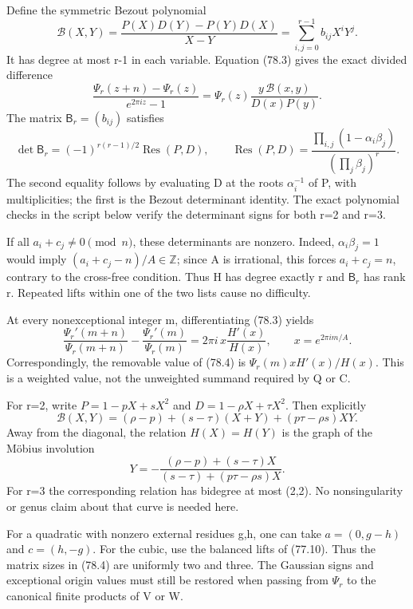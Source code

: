 \documentclass[11pt,reqno]{amsart}
\theoremstyle{plain}
\begin{document}
Define the symmetric Bezout polynomial
\[
 \mathcal B(X,Y)=
 \frac{P(X)D(Y)-P(Y)D(X)}{X-Y}
 =\sum_{i,j=0}^{r-1} b_{ij}X^iY^j.
\]
It has degree at most r-1 in each variable. Equation (78.3) gives
the exact divided difference
\begin{equation*}
 \boxed{\displaystyle
 \frac{\Psi_r(z+n)-\Psi_r(z)}{e^{2\pi iz}-1}
 =\Psi_r(z)\frac{y\,\mathcal B(x,y)}{D(x)P(y)}.}
 \tag{78.4}
\end{equation*}
The matrix \(\mathsf B_r=(b_{ij})\) satisfies
\begin{equation*}
 \det\mathsf B_r=(-1)^{r(r-1)/2}\operatorname{Res}(P,D),
 \qquad
 \operatorname{Res}(P,D)
 =\frac{\prod_{i,j}(1-\alpha_i\beta_j)}
        {(\prod_j\beta_j)^r}.
 \tag{78.5}
\end{equation*}
The second equality follows by evaluating D at the roots
\(\alpha_i^{-1}\) of P, with multiplicities; the first is the
Bezout determinant identity. The exact polynomial checks in the
script below verify the determinant signs for both r=2 and r=3.

If all \(a_i+c_j\ne0\pmod n\), these determinants are nonzero.
Indeed, \(\alpha_i\beta_j=1\) would imply
\((a_i+c_j-n)/A\in\mathbb Z\); since A is irrational, this
forces \(a_i+c_j=n\), contrary to the cross-free condition.
Thus H has degree exactly r and \(\mathsf B_r\) has rank r.
Repeated lifts within one of the two lists cause no difficulty.

At every nonexceptional integer m, differentiating (78.3) yields
\begin{equation*}
 \frac{\Psi_r'(m+n)}{\Psi_r(m+n)}-
 \frac{\Psi_r'(m)}{\Psi_r(m)}
 =2\pi i\,x\frac{H'(x)}{H(x)},
 \qquad x=e^{2\pi im/A}.
 \tag{78.6}
\end{equation*}
Correspondingly, the removable value of (78.4) is
\(\Psi_r(m)xH'(x)/H(x)\). This is a weighted value, not
the unweighted summand required by Q or C.

For r=2, write
\(P=1-pX+sX^2\) and \(D=1-\rho X+\tau X^2\).
Then explicitly
\[
 \mathcal B(X,Y)=(\rho-p)+(s-\tau)(X+Y)
                    +(p\tau-\rho s)XY.
\]
Away from the diagonal, the relation \(H(X)=H(Y)\) is the
graph of the M\"obius involution
\[
 Y=-\frac{(\rho-p)+(s-\tau)X}
          {(s-\tau)+(p\tau-\rho s)X}.
\]
For r=3 the corresponding relation has bidegree at most (2,2).
No nonsingularity or genus claim about that curve is needed here.

For a quadratic with nonzero external residues g,h, one can take
\(a=(0,g-h)\) and \(c=(h,-g)\). For the cubic, use the
balanced lifts of (77.10). Thus the matrix sizes in (78.4) are
uniformly two and three. The Gaussian signs and exceptional origin
values must still be restored when passing from \(\Psi_r\) to
the canonical finite products of V or W.
\end{document}
